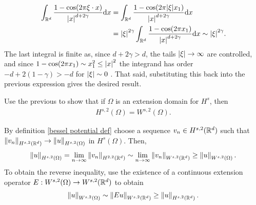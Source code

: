 \documentclass[
    a4paper,
    DIV=14,
    abstract=true,
    numbers=noenddot
]{scrartcl}
\begin{document}
\begin{hint}
    \begin{align*}
        \int_{\mathbb{R}^d}  \frac{1-\cos(2\pi \xi\cdot x)}{{\left| x \right|}^{d+2\gamma	}}\mathrm{d} x & =\int_{\mathbb{R}^d}  \frac{1-\cos(2\pi {\left| \xi \right|}x_1 )}{{\left| x \right|}^{d+2\gamma	}}\mathrm{d} x                                          \\
                                                                              & ={\left| \xi \right|}^{2 \gamma } \int_{\mathbb{R}^d}  \frac{1-\cos(2\pi  x_1) }{{\left| x \right|}^{d+2\gamma	}}\mathrm{d} x\sim {\left| \xi \right|}^{2 \gamma }.
    \end{align*}
    The last integral is finite as, since $d+2\gamma >d$, the tails ${\left| \xi \right|}\to\infty$ are controlled, and since $1-\cos(2\pi x_1)\sim x_1^2\leq {\left| x \right|}^2$ the integrand has order $-d+2(1-\gamma)>-d$ for ${\left| \xi \right|}\sim 0$ . That said, substituting this back into the previous expression gives the desired result.
\end{hint}
\begin{exercise}
    Use the previous  to show that if $\Omega $ is an extension domain for $H^{s}$, then
    \begin{align*}
        H^{s,2}(\Omega )=W^{s,2}(\Omega ).
    \end{align*}
\end{exercise}
\begin{hint}
    By definition \ref{bessel potential def} choose a sequence $v_n \in H^{s,2}(\mathbb{R}^d)$ such that $\left\lVert v_n \right\rVert_{H^{s,2}(\mathbb{R}^d)} \to \left\lVert u \right\rVert_{H^{s,2}(\Omega )}$ in $H^s(\Omega )$. Then,
    \begin{align*}
        \left\lVert u \right\rVert_{H^{s,2}(\Omega)}= \lim_{n\to\infty}\left\lVert v_n \right\rVert_{H^{2,2}(\mathbb{R}^d)}\sim \lim_{n\to\infty}\left\lVert v_n \right\rVert_{W^{s,2}(\mathbb{R}^d)}\geq \left\lVert u \right\rVert_{W^{s,2}(\Omega )}.
    \end{align*}
    To obtain the reverse inequality, use the existence of a continuous extension operator $E: W^{s,2}(\Omega )\to W^{s,2}(\mathbb{R}^d)$ to obtain
    \begin{align*}
        \left\lVert u \right\rVert_{W^{s,2}(\Omega )}\sim \left\lVert Eu \right\rVert_{W^{s,2}(\mathbb{R}^d)}\geq \left\lVert u \right\rVert_{H^{s,2}(\mathbb{R}^d)}.
    \end{align*}

\end{hint}
\end{document}
